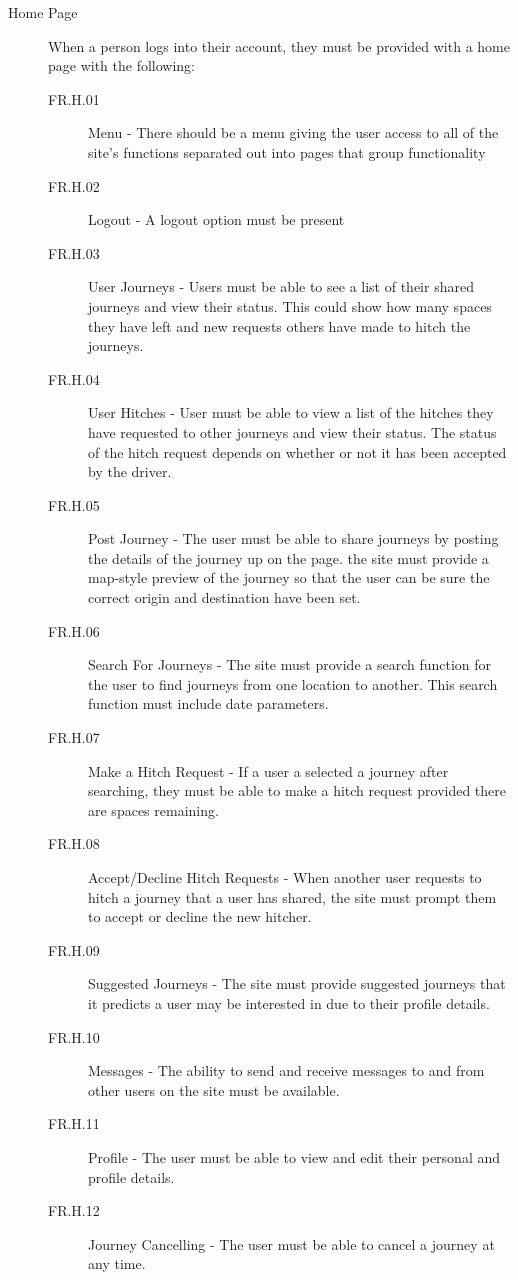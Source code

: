 \documentclass[11pt]{article}
\begin{document}
\begin{description}
\item[Home Page] When a person logs into their account, they must be provided with a home page with the following:
\begin{description}
\item[FR.H.01] Menu - There should be a menu giving the user access to all of the site's functions separated out into pages that group functionality 
\item[FR.H.02] Logout - A logout option must be present
\item[FR.H.03] User Journeys - Users must be able to see a list of their shared journeys and view their status. This could show how many spaces they have left and new requests others have made to hitch the journeys.
\item[FR.H.04] User Hitches - User must be able to view a list of the hitches they have requested to other journeys and view their status. The status of the hitch request depends on whether or not it has been accepted by the driver.
\item[FR.H.05] Post Journey - The user must be able to share journeys by posting the details of the journey up on the page. the site must provide a map-style preview of the journey so that the user can be sure the correct origin and destination have been set.
\item[FR.H.06] Search For Journeys - The site must provide a search function for the user to find journeys from one location to another. This search function must include date parameters.
\item[FR.H.07] Make a Hitch Request - If a user a selected a journey after searching, they must be able to make a hitch request provided there are spaces remaining.
\item[FR.H.08] Accept/Decline Hitch Requests - When another user requests to hitch a journey that a user has shared, the site must prompt them to accept or decline the new hitcher.
\item[FR.H.09] Suggested Journeys - The site must provide suggested journeys that it predicts a user may be interested in due to their profile details.
\item[FR.H.10] Messages - The ability to send and receive messages to and from other users on the site must be available.
\item[FR.H.11] Profile - The user must be able to view and edit their personal and profile details. 
\item[FR.H.12] Journey Cancelling - The user must be able to cancel a journey at any time.
\end{description}
\end{description}
\end{document}
